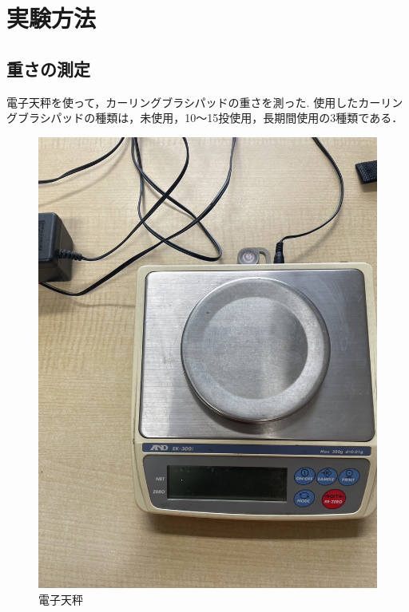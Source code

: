 \documentclass[main]{subfiles}
\begin{document}
\chapter{実験方法}
\section{重さの測定}
電子天秤を使って，カーリングブラシパッドの重さを測った.
使用したカーリングブラシパッドの種類は，未使用，10～15投使用，長期間使用の3種類である．
\begin{figure}[htbp]
    \centering
    \includegraphics[width=0.5\linewidth, height=0.6\linewidth]{figures/denshitenbinn.jpg}
    \caption{電子天秤}
    \label{fig:label}
\end{figure}
\end{document}
